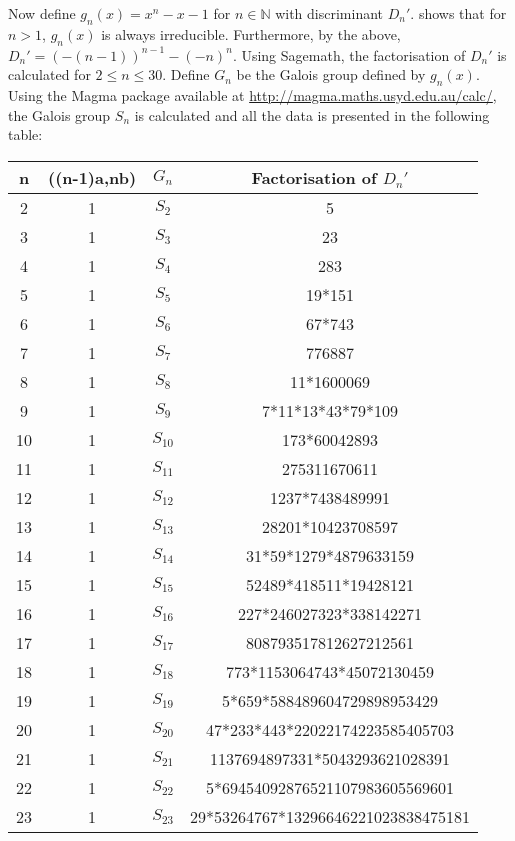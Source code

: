 \documentclass[12pt]{extarticle}
\newcommand{\<}{\langle}
\renewcommand{\>}{\rangle}
\theoremstyle{definition}
\begin{document}
Now define $g_n(x) = x^n-x-1$ for $ n \in \mathbb{N}$ with discriminant $D_n'$. \cite{SELMER} shows that for $n>1$, $g_n(x)$ is always irreducible. Furthermore, by the above, $D_n'= (-(n-1))^{n-1} - (-n)^{n}$. 
Using Sagemath, the factorisation of $D_n'$ is calculated for $2 \leq n \leq 30$. Define $G_n$ be the Galois group defined by $g_n(x)$. Using the Magma package available at \url{http://magma.maths.usyd.edu.au/calc/}, the Galois group $S_n$ is calculated and all the data is presented in the following table:
\begin{center}
 \begin{tabular}{||c | c | c | c||} 
 \hline
 n & ((n-1)a,nb) & $G_n$ & Factorisation of $D_n'$ \\ [0.5ex] 
 \hline\hline
2 & 1 & $S_{2}$ & 5 \\
\hline
3 & 1 & $S_{3}$ & 23 \\
\hline
4 & 1 & $S_{4}$ & 283 \\
\hline
5 & 1 & $S_{5}$ & 19*151 \\
\hline
6 & 1 & $S_{6}$ & 67*743 \\
\hline
7 & 1 & $S_{7}$ & 776887 \\
\hline
8 & 1 & $S_{8}$ & 11*1600069 \\
\hline
9 & 1 & $S_{9}$ & 7*11*13*43*79*109 \\
\hline
10 & 1 & $S_{10}$ & 173*60042893 \\
\hline
11 & 1 & $S_{11}$ & 275311670611 \\
\hline
12 & 1 & $S_{12}$ & 1237*7438489991 \\
\hline
13 & 1 & $S_{13}$ & 28201*10423708597 \\
\hline
14 & 1 & $S_{14}$ & 31*59*1279*4879633159 \\
\hline
15 & 1 & $S_{15}$ & 52489*418511*19428121 \\
\hline
16 & 1 & $S_{16}$ & 227*246027323*338142271 \\
\hline
17 & 1 & $S_{17}$ & 808793517812627212561 \\
\hline
18 & 1 & $S_{18}$ & 773*1153064743*45072130459 \\
\hline
19 & 1 & $S_{19}$ & 5*659*588489604729898953429 \\
\hline
20 & 1 & $S_{20}$ & 47*233*443*22022174223585405703 \\
\hline
21 & 1 & $S_{21}$ & 1137694897331*5043293621028391 \\
\hline
22 & 1 & $S_{22}$ & 5*69454092876521107983605569601 \\
\hline
23 & 1 & $S_{23}$ & 29*53264767*13296646221023838475181 \\

\end{tabular}
\end{center}
\end{document}
